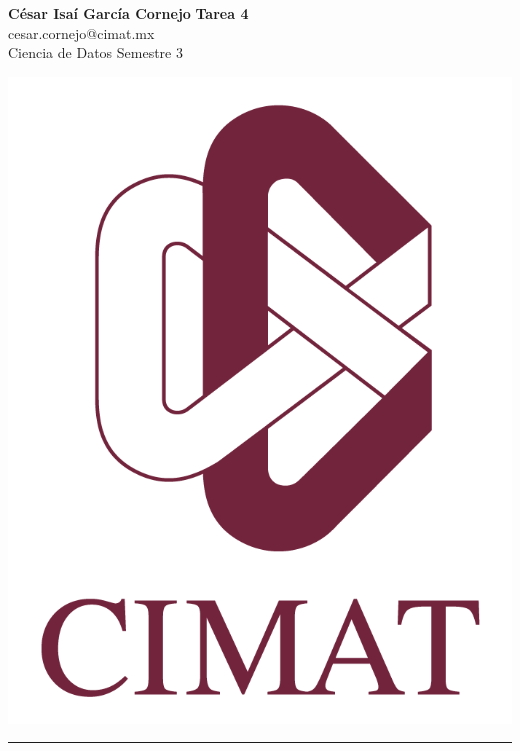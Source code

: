 \documentclass[a4paper, 11pt]{article}
\begin{document}
	\noindent
	
	\begin{minipage}[b][1.2cm][t]{0.8\textwidth}
		\large\textbf{César Isaí García Cornejo} \hfill \textbf{Tarea 4}  \\
		cesar.cornejo@cimat.mx \hfill \\
		\normalsize Ciencia de Datos \hfill Semestre 3\\
	\end{minipage}
	
	\hspace{14.4cm}
	\begin{minipage}[b][0.03cm][t]{0.12\linewidth}
		
		\vspace{-2.2cm}
		\includegraphics[scale=0.3]{Images/EscudoCimat.png}
	\end{minipage}
	
	\noindent\rule{7in}{2.8pt}
	
\end{document}
